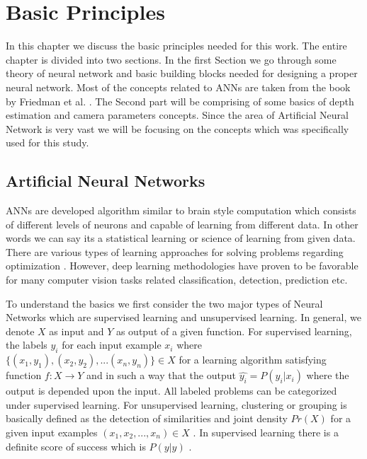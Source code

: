 
\chapter{Basic Principles}
\label{Chapter2:Background} 

In this chapter we  discuss the basic  principles needed for this work. The entire chapter is divided into two sections. In the first Section we go through some theory of neural network and basic building blocks needed for designing a proper neural network. Most of the concepts related to ANNs are taken from the book by Friedman et al. \cite{friedman2001elements}. The Second part will be comprising of some basics of depth estimation and camera parameters concepts. Since the area of Artificial Neural Network is very vast we will be focusing on the concepts which was specifically used for this study. 

\section{Artificial Neural Networks}

ANNs are developed algorithm similar to brain style computation which consists of different levels of neurons and capable of learning from different data. In other words we can say its a statistical learning or science of learning from given data. There are various types of learning approaches for solving problems regarding optimization . However, deep learning methodologies have proven to be favorable for many computer vision tasks related classification, detection, prediction etc.\cite{friedman2001elements} 

To understand the basics we first consider the two major types of Neural Networks which are supervised learning and unsupervised learning. In general, we denote \(X\) as input and \(Y\) as output of a given function. For supervised learning, the labels \(y_{i}\) for each input example \(x_{i}\) where    \(\{(x_{1},y_{1}),(x_{2},y_{2}),...(x_{n},y_{n})\} \in X\) for a learning algorithm satisfying function \(f:X \rightarrow Y\) and in such a way that the output \( \hat{y_{i}} = P (y_{i}|x_{i})\) where the output is depended upon the input. All labeled problems can be categorized under supervised learning. For  unsupervised learning, clustering or grouping is basically defined as the detection of similarities and joint density \(Pr(X)\) for a given input examples \({(x_{1},x_{2},...,x_{n})} \in X\) . In supervised learning there is a definite score of success which is \(P(y|y)\) \cite{friedman2001elements}. 

